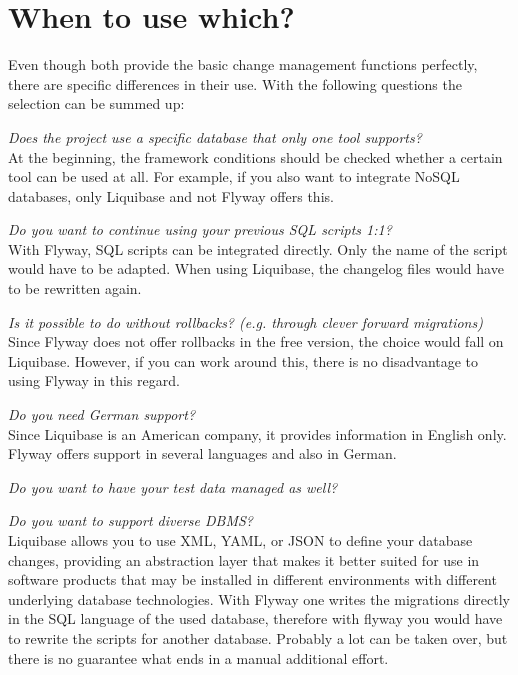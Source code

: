 \section{When to use which?}

%
Even though both provide the basic change management functions perfectly,
there are specific differences in their use. With the following questions the selection can be summed up:

\textit{Does the project use a specific database that only one tool supports?}\\
At the beginning, the framework conditions should be checked whether a certain tool can be used at all. For example, if you also want to integrate NoSQL databases, only Liquibase and not Flyway offers this.

\textit{Do you want to continue using your previous SQL scripts 1:1?}\\
With Flyway, SQL scripts can be integrated directly. Only the name of the script would have to be adapted. When using Liquibase, the changelog files would have to be rewritten again.

\textit{Is it possible to do without rollbacks? (e.g. through clever forward migrations)}\\
Since Flyway does not offer rollbacks in the free version, the choice would fall on Liquibase. However, if you can work around this, there is no disadvantage to using Flyway in this regard.

\textit{Do you need German support?}\\
Since Liquibase is an American company, it provides information in English only. Flyway offers support in several languages and also in German.

\textit{Do you want to have your test data managed as well?}\\

\textit{Do you want to support diverse DBMS?}\\
Liquibase allows you to use XML, YAML, or JSON to define your database changes, providing an abstraction layer that makes it better suited for use in software products that may be installed in different environments with different underlying database technologies. With Flyway one writes the migrations directly in the SQL language of the used database, therefore with flyway you would have to rewrite the scripts for another database. Probably a lot can be taken over, but there is no guarantee what ends in a manual additional effort.
\vspace{0.5cm}

